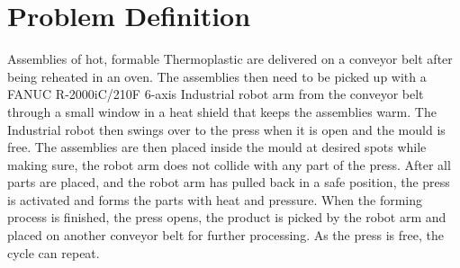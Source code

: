 
\chapter{Problem Definition}

Assemblies of hot, formable Thermoplastic are delivered on a conveyor belt after being reheated in an oven. 
The assemblies then need to be picked up with a FANUC R-2000iC/210F 6-axis Industrial robot arm from the conveyor belt through a small window in a heat shield that keeps the assemblies warm. 
The Industrial robot then swings over to the press when it is open and the mould is free. 
The assemblies are then placed inside the mould at desired spots while making sure, the robot arm does not collide with any part of the press. 
After all parts are placed, and the robot arm has pulled back in a safe position, the press is activated and forms the parts with heat and pressure. 
When the forming process is finished, the press opens, the product is picked by the robot arm and placed on another conveyor belt for further processing. 
As the press is free, the cycle can repeat.
\cite{SystemRequirements}